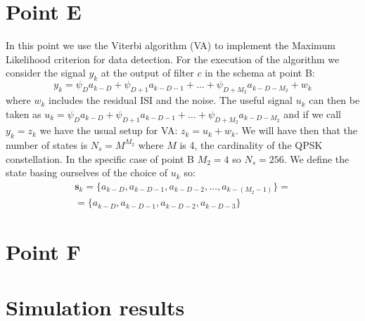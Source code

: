 \documentclass[a4paper,11.5pt]{article}
\newcommand{\vt}{\boldsymbol}
\begin{document}
\section*{Point E}

In this point we use the Viterbi algorithm (VA) to implement the Maximum Likelihood criterion for data detection. 
For the execution of the algorithm we consider the signal $y_k$ at the output of filter $c$ in the schema at point B:
\begin{equation}
y_k = \psi_D a_{k-D} + \psi_{D+1} a_{k-D-1} + \dots +\psi_{D+M_2} a_{k-D-M_2} + w_k
\end{equation}
where $w_k$ includes the residual ISI and the noise. The useful signal $u_k$ can then be taken as $u_k=\psi_D a_{k-D} + \psi_{D+1} a_{k-D-1} + \dots +\psi_{D+M_2} a_{k-D-M_2}$ and if we call $y_k=z_k$ we have the usual setup for VA: $z_k = u_k+w_k$. We will have then that the number of states is $N_s=M^{M_2}$ where $M$ is 4, the cardinality of the QPSK constellation. In the specific case of point B $M_2=4$ so $N_s=256$. We define the state basing ourselves of the choice of $u_k$ so:
\begin{equation}
\begin{split}
\vt{s}_k = \{a_{k-D}, a_{k-D-1}, a_{k-D-2}, \dots, a_{k-(M_2-1)}\} = \\
= \{a_{k-D}, a_{k-D-1}, a_{k-D-2}, a_{k-D-3}\}
\end{split}
\end{equation}

\section*{Point F}

\section*{Simulation results}
\end{document}
